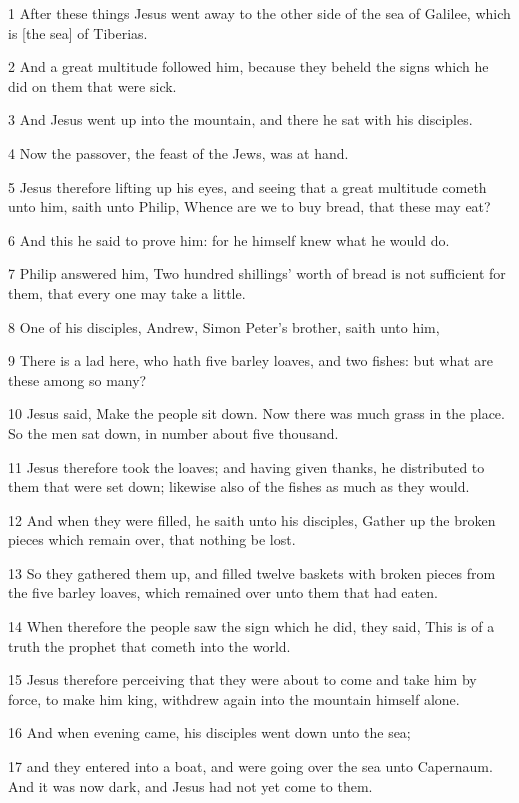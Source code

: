 \par 1 After these things Jesus went away to the other side of the sea of Galilee, which is [the sea] of Tiberias.
\par 2 And a great multitude followed him, because they beheld the signs which he did on them that were sick.
\par 3 And Jesus went up into the mountain, and there he sat with his disciples.
\par 4 Now the passover, the feast of the Jews, was at hand.
\par 5 Jesus therefore lifting up his eyes, and seeing that a great multitude cometh unto him, saith unto Philip, Whence are we to buy bread, that these may eat?
\par 6 And this he said to prove him: for he himself knew what he would do.
\par 7 Philip answered him, Two hundred shillings' worth of bread is not sufficient for them, that every one may take a little.
\par 8 One of his disciples, Andrew, Simon Peter's brother, saith unto him,
\par 9 There is a lad here, who hath five barley loaves, and two fishes: but what are these among so many?
\par 10 Jesus said, Make the people sit down. Now there was much grass in the place. So the men sat down, in number about five thousand.
\par 11 Jesus therefore took the loaves; and having given thanks, he distributed to them that were set down; likewise also of the fishes as much as they would.
\par 12 And when they were filled, he saith unto his disciples, Gather up the broken pieces which remain over, that nothing be lost.
\par 13 So they gathered them up, and filled twelve baskets with broken pieces from the five barley loaves, which remained over unto them that had eaten.
\par 14 When therefore the people saw the sign which he did, they said, This is of a truth the prophet that cometh into the world.
\par 15 Jesus therefore perceiving that they were about to come and take him by force, to make him king, withdrew again into the mountain himself alone.
\par 16 And when evening came, his disciples went down unto the sea;
\par 17 and they entered into a boat, and were going over the sea unto Capernaum. And it was now dark, and Jesus had not yet come to them.
